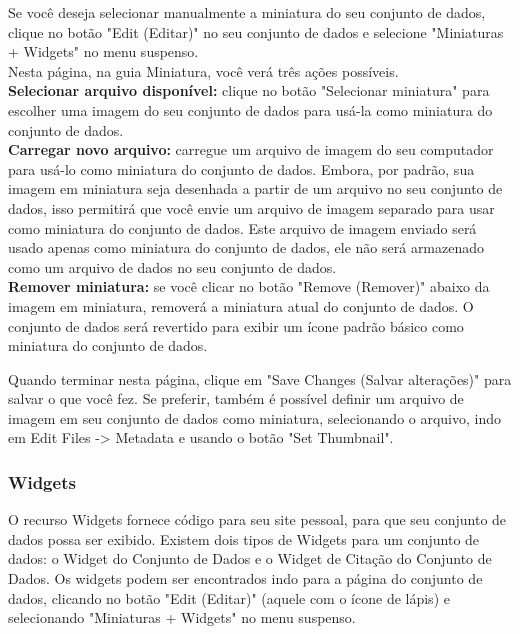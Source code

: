 \documentclass[12pt,hidelinks]{article}
\begin{document}
Se você deseja selecionar manualmente a miniatura do seu conjunto de dados, clique no botão "Edit (Editar)" no seu conjunto de dados e selecione "Miniaturas + Widgets" no menu suspenso.\\

Nesta página, na guia Miniatura, você verá três ações possíveis.\\

\textbf{Selecionar arquivo disponível:} clique no botão "Selecionar miniatura" para \\escolher uma imagem do seu conjunto de dados para usá-la como miniatura do conjunto de dados.\\

\textbf{Carregar novo arquivo:} carregue um arquivo de imagem do seu computador para usá-lo como miniatura do conjunto de dados. Embora, por padrão, sua imagem em miniatura seja desenhada a partir de um arquivo no seu conjunto de dados, isso permitirá que você envie um arquivo de imagem separado para usar como miniatura do conjunto de dados. Este arquivo de imagem enviado será usado apenas como miniatura do conjunto de dados, ele não será armazenado como um arquivo de dados no seu conjunto de dados.\\

\textbf{Remover miniatura:} se você clicar no botão "Remove (Remover)" abaixo da imagem em miniatura, removerá a miniatura atual do conjunto de dados. O conjunto de dados será revertido para exibir um ícone padrão básico como miniatura do conjunto de dados.

Quando terminar nesta página, clique em "Save Changes (Salvar alterações)" para salvar o que você fez. Se preferir, também é possível definir um arquivo de imagem em seu conjunto de dados como miniatura, selecionando o arquivo, indo em Edit Files -> Metadata e usando o botão "Set Thumbnail".
        
        \subsubsection{Widgets}
        
\qquad O recurso Widgets fornece código para seu site pessoal, para que seu conjunto de dados possa ser exibido. Existem dois tipos de Widgets para um conjunto de dados: o Widget do Conjunto de Dados e o Widget de Citação do Conjunto de Dados. Os widgets podem ser encontrados indo para a página do conjunto de dados, clicando no botão "Edit (Editar)" (aquele com o ícone de lápis) e selecionando "Miniaturas + Widgets" no menu suspenso.
\end{document}
